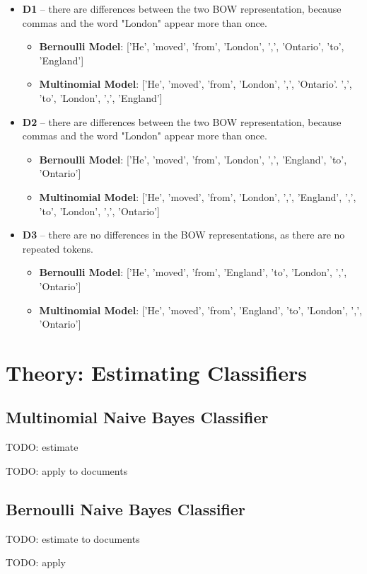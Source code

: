 \documentclass{article}
\begin{document}
\begin{itemize}
	\item \textbf{D1} -- there are differences between the two BOW representation, because commas and the word "London" appear more than once. \begin{itemize}
		\item \textbf{Bernoulli Model}: ['He', 'moved', 'from', 'London', ',', 'Ontario', 'to', 'England']
		\item \textbf{Multinomial Model}: ['He', 'moved', 'from', 'London', ',', 'Ontario'. ',', 'to', 'London', ',', 'England']
		\end{itemize}
	\item \textbf{D2} -- there are differences between the two BOW representation, because commas and the word "London" appear more than once. \begin{itemize}
		\item \textbf{Bernoulli Model}: ['He', 'moved', 'from', 'London', ',', 'England', 'to', 'Ontario']
		\item \textbf{Multinomial Model}: ['He', 'moved', 'from', 'London', ',', 'England', ',', 'to', 'London', ',', 'Ontario']
	  \end{itemize}
	\item \textbf{D3} -- there are no differences in the BOW representations, as there are no repeated tokens.
	\begin{itemize}
	\item \textbf{Bernoulli Model}: ['He', 'moved', 'from', 'England', 'to', 'London', ',', 'Ontario']
	\item \textbf{Multinomial Model}: ['He', 'moved', 'from', 'England', 'to', 'London', ',', 'Ontario']
	\end{itemize}
\end{itemize}

\section{Theory: Estimating Classifiers}

\subsection{Multinomial Naive Bayes Classifier}

	TODO: estimate

TODO: apply to documents

\subsection{Bernoulli Naive Bayes Classifier}

TODO: estimate to documents

TODO: apply
\end{document}
